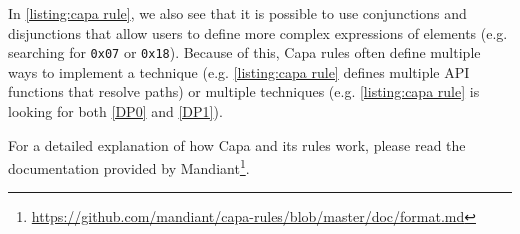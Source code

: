 In \autoref{listing:capa rule}, we also see that it is possible to use conjunctions and disjunctions that allow users to define more complex expressions of elements (e.g. searching for \texttt{0x07} or \texttt{0x18}). Because of this, Capa rules often define multiple ways to implement a technique (e.g. \autoref{listing:capa rule} defines multiple API functions that resolve paths) or multiple techniques (e.g. \autoref{listing:capa rule} is looking for both \autoref{DP0} and \autoref{DP1}).

\medskip

For a detailed explanation of how Capa and its rules work, please read the documentation provided by Mandiant\footnote{\tiny \url{https://github.com/mandiant/capa-rules/blob/master/doc/format.md}}.

